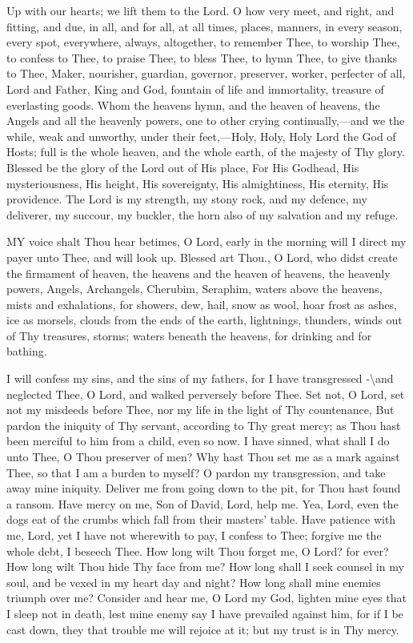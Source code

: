 
Up with our hearts; we lift them to the Lord. O how very meet, and right, and fitting, and due, in all, and for all, at all times, places, manners, in every season, every spot, everywhere, always, altogether, to remember Thee, to worship Thee, to confess to Thee, to praise Thee, to bless Thee, to hymn Thee, to give thanks to Thee, Maker, nourisher, guardian, governor, preserver, worker, perfecter of all, Lord and Father, King and God, fountain of life and immortality, treasure of everlasting goods. Whom the heavens hymn, and the heaven of heavens, the Angels and all the heavenly powers, one to other crying continually,—and we the while, weak and unworthy, under their feet,—Holy, Holy, Holy Lord the God of Hosts; full is the whole heaven, and the whole earth, of the majesty of Thy glory. Blessed be the glory of the Lord out of His place, For His Godhead, His mysteriousness, His height, His sovereignty, His almightiness, His eternity, His providence. The Lord is my strength, my stony rock, and my defence, my deliverer, my succour, my buckler, the horn also of my salvation and my refuge.



MY voice shalt Thou hear betimes, O Lord, early in the morning will I direct my payer unto Thee, and will look up. Blessed art Thou., O Lord, who didst create the firmament of heaven, the heavens and the heaven of heavens, the heavenly powers, Angels, Archangels, Cherubim, Seraphim, waters above the heavens, mists and exhalations, for showers, dew, hail, snow as wool, hoar frost as ashes, ice as morsels, clouds from the ends of the earth, lightnings, thunders, winds out of Thy treasures, storms; waters beneath the heavens, for drinking and for bathing.


I will confess my sins, and the sins of my fathers, for I have transgressed ‑\textbackslash{}and neglected Thee, O Lord, and walked perversely before Thee. Set not, O Lord, set not my misdeeds before Thee, nor my life in the light of Thy countenance, But pardon the iniquity of Thy servant, according to Thy great mercy; as Thou hast been merciful to him from a child, even so now. I have sinned, what shall I do unto Thee, O Thou preserver of men? Why hast Thou set me as a mark against Thee, so that I am a burden to myself? O pardon my transgression, and take away mine iniquity. Deliver me from going down to the pit, for Thou hast found a ransom. Have mercy on me, Son of David, Lord, help me. Yea, Lord, even the dogs eat of the crumbs which fall from their masters’ table. Have patience with me, Lord, yet I have not wherewith to pay, I confess to Thee; forgive me the whole debt, I beseech Thee. How long wilt Thou forget me, O Lord? for ever? How long wilt Thou hide Thy face  from me? How long shall I seek counsel in my soul, and be vexed in my heart day and night? How long shall mine enemies triumph over me? Consider and hear me, O Lord my God, lighten mine eyes that I sleep not in death, lest mine enemy say I have prevailed against him, for if I be cast down, they that trouble me will rejoice at it; but my trust is in Thy mercy.

